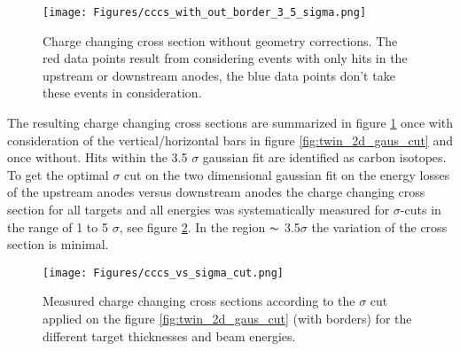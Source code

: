 \begin{figure}[htpb]
    \centering
    \texttt{[image: Figures/cccs\_with\_out\_border\_3\_5\_sigma.png]}
    \caption{
    Charge changing cross section without geometry corrections. The red data points result from considering events with only hits in the upstream or downstream anodes, the blue data points don't take these events in consideration. 
     }
    \label{fig:cccs_with_out_border_3_5}
\end{figure}
The resulting charge changing cross sections are summarized in figure \ref{fig:cccs_with_out_border_3_5} once with consideration of the vertical/horizontal bars in figure \ref{fig:twin_2d_gaus_cut} and once without. Hits within the 3.5 $\sigma$ gaussian fit are identified as carbon isotopes.
To get the optimal $\sigma$ cut on the two dimensional gaussian fit on the energy losses of the upstream anodes versus downstream anodes the charge changing cross section for all targets and all energies was systematically measured for $\sigma$-cuts in the range of 1 to 5 $\sigma$, see figure \ref{fig:cccs_vs_sigma_cut}. In the region $\thicksim$ 3.5$\sigma$ the variation of the cross section is minimal.
\begin{figure}[htpb]
    \centering
    \texttt{[image: Figures/cccs\_vs\_sigma\_cut.png]}
    \caption{
    Measured charge changing cross sections according to the $\sigma$ cut applied on the figure \ref{fig:twin_2d_gaus_cut} (with borders) for the different target thicknesses and beam energies.
     }
    \label{fig:cccs_vs_sigma_cut}
\end{figure}
